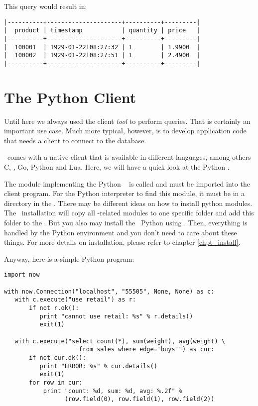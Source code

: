 \begin{minipage}{\textwidth}
This query would result in:

\begin{verbatim}
|----------+---------------------+----------+---------|
|  product | timestamp           | quantity | price   |
|----------+---------------------+----------+---------|
|  100001  | 1929-01-22T08:27:32 | 1        | 1.9900  |
|  100002  | 1929-01-22T08:27:51 | 1        | 2.4900  |
|----------+---------------------+----------+---------|
\end{verbatim}
\end{minipage}

\section{The Python Client}
Until here we always used the client \emph{tool}
to perform queries.
That is certainly an important use case.
Much more typical, however, is to develop application code
that needs a client  to connect to the database.

\nowdb\ comes with a native client 
that is available in different languages, among others
C, \CC, Go, Python and Lua.
Here, we will have a quick look at the Python .

The module implementing the Python \nowdb\ 
is called  and must be imported into the client program.
For the Python interpreter to find this module,
it must be in a directory in the .
There may be different ideas on how to install python modules.
The \nowdb\ installation will copy all \nowdb-related modules
to one specific folder and add this folder to the
. But you also may install
the \nowdb\ Python  using .
Then, everything is handled by the Python environment
and you don't need to care about these things.
For more details on installation, please refer
to chapter \ref{chpt_install}.

Anyway, here is a simple Python program:

\begin{python}
\begin{lstlisting}
import now

with now.Connection("localhost", "55505", None, None) as c:
   with c.execute("use retail") as r:
       if not r.ok():
          print "cannot use retail: %s" % r.details()
          exit(1)

   with c.execute("select count(*), sum(weight), avg(weight) \
                     from sales where edge='buys'") as cur:
       if not cur.ok():
          print "ERROR: %s" % cur.details()
          exit(1)
       for row in cur:
           print "count: %d, sum: %d, avg: %.2f" %
                 (row.field(0), row.field(1), row.field(2))
\end{lstlisting}
\end{python}

